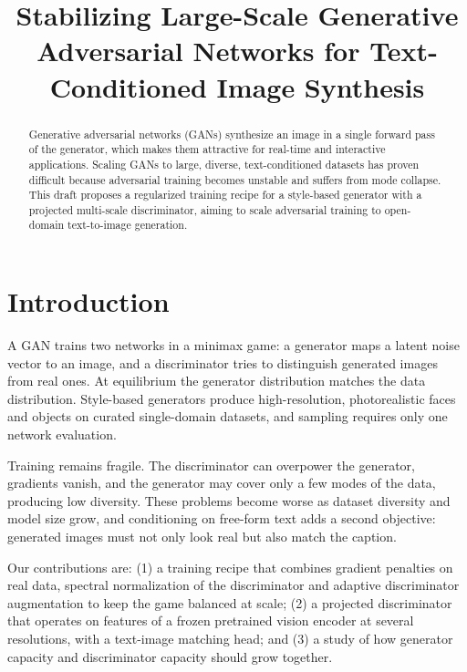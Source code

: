 \documentclass{article}
\title{Stabilizing Large-Scale Generative Adversarial Networks for Text-Conditioned Image Synthesis}
\begin{document}
\maketitle

\begin{abstract}
Generative adversarial networks (GANs) synthesize an image in a single forward
pass of the generator, which makes them attractive for real-time and
interactive applications. Scaling GANs to large, diverse, text-conditioned
datasets has proven difficult because adversarial training becomes unstable
and suffers from mode collapse. This draft proposes a regularized training
recipe for a style-based generator with a projected multi-scale discriminator,
aiming to scale adversarial training to open-domain text-to-image generation.
\end{abstract}

\section{Introduction}
A GAN trains two networks in a minimax game: a generator maps a latent noise
vector to an image, and a discriminator tries to distinguish generated images
from real ones. At equilibrium the generator distribution matches the data
distribution. Style-based generators produce high-resolution, photorealistic
faces and objects on curated single-domain datasets, and sampling requires
only one network evaluation.

Training remains fragile. The discriminator can overpower the generator,
gradients vanish, and the generator may cover only a few modes of the data,
producing low diversity. These problems become worse as dataset diversity and
model size grow, and conditioning on free-form text adds a second objective:
generated images must not only look real but also match the caption.

Our contributions are: (1) a training recipe that combines gradient penalties
on real data, spectral normalization of the discriminator and adaptive
discriminator augmentation to keep the game balanced at scale; (2) a projected
discriminator that operates on features of a frozen pretrained vision encoder
at several resolutions, with a text-image matching head; and (3) a study of
how generator capacity and discriminator capacity should grow together.
\end{document}
